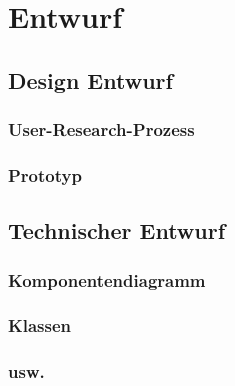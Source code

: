 \chapter{Entwurf}
	\section{Design Entwurf}	
		\subsection{User-Research-Prozess} 
		\subsection{Prototyp}
	\section{Technischer Entwurf} 	
		\subsection{Komponentendiagramm}
		\subsection{Klassen}
		\subsection{usw.}
		